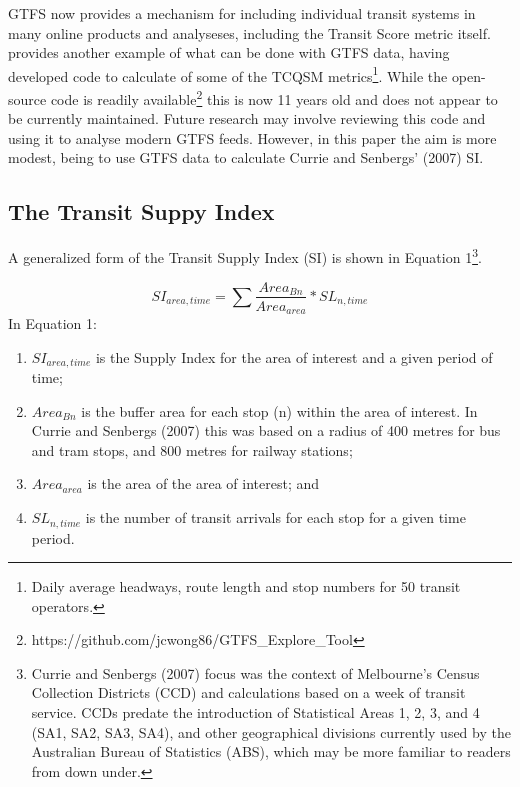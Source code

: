 \documentclass[preprint, 3p,
authoryear]{elsarticle} %
\providecommand{\tightlist}{%
  \setlength{\itemsep}{0pt}\setlength{\parskip}{0pt}}
\begin{document}
GTFS now provides a mechanism for including individual transit systems
in many online products and analyseses, including the Transit Score
metric itself. \citet{Wong:2013aa} provides another example of what can
be done with GTFS data, having developed code to calculate of some of
the TCQSM metrics\footnote{ Daily average headways, route length and
  stop numbers for 50 transit operators.}. While the \citet{Wong:2013aa}
open-source code is readily available\footnote{
  https://github.com/jcwong86/GTFS\_Explore\_Tool} this is now 11 years
old and does not appear to be currently maintained. Future research may
involve reviewing this code and using it to analyse modern GTFS feeds.
However, in this paper the aim is more modest, being to use GTFS data to
calculate Currie and Senbergs' (2007) SI.

\hypertarget{the-transit-suppy-index}{%
\subsection{The Transit Suppy Index}\label{the-transit-suppy-index}}

A generalized form of the Transit Supply Index (SI) is shown in Equation
1\footnote{Currie and Senbergs (2007) focus was the context of
  Melbourne's Census Collection Districts (CCD) and calculations based
  on a week of transit service. CCDs predate the introduction of
  Statistical Areas 1, 2, 3, and 4 (SA1, SA2, SA3, SA4), and other
  geographical divisions currently used by the Australian Bureau of
  Statistics (ABS), which may be more familiar to readers from down
  under.}.

\[SI_{area, time} = \sum{\frac{Area_{Bn}}{Area_{area}}*SL_{n, time}}\]
In Equation 1:

\begin{enumerate}
\def\labelenumi{(\arabic{enumi})}
\tightlist
\item
  \(SI_{area, time}\) is the Supply Index for the area of interest and a
  given period of time;
\item
  \(Area_{Bn}\) is the buffer area for each stop (n) within the area of
  interest. In Currie and Senbergs (2007) this was based on a radius of
  400 metres for bus and tram stops, and 800 metres for railway
  stations;
\item
  \(Area_{area}\) is the area of the area of interest; and
\item
  \(SL_{n,time}\) is the number of transit arrivals for each stop for a
  given time period.
\end{enumerate}
\end{document}
